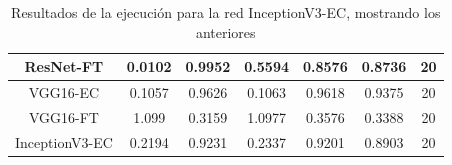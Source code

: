 \documentclass[11pt,a4paper]{article}
\theoremstyle{definition}
\begin{document}
\begin{table}[H]
\begin{tabular}{|c|c|c|c|c|c|c|}
\hline
ResNet-FT                                           & \textcolor[rgb]{0.129,0.129,0.129}{0.0102 } & \textcolor[rgb]{0.129,0.129,0.129}{0.9952 } & \textcolor[rgb]{0.129,0.129,0.129}{0.5594 }                                                                       & \textcolor[rgb]{0.129,0.129,0.129}{0.8576}                                                                             & \textcolor[rgb]{0.129,0.129,0.129}{0.8736}                                                                       & 20                                                                                                              \\
\hline
VGG16-EC                                               & \textcolor[rgb]{0.129,0.129,0.129}{0.1057 } & \textcolor[rgb]{0.129,0.129,0.129}{0.9626 } & \textcolor[rgb]{0.129,0.129,0.129}{0.1063 }                                                                       & \textcolor[rgb]{0.129,0.129,0.129}{0.9618}                                                                             & \textcolor[rgb]{0.129,0.129,0.129}{0.9375}                                                                       & 20                                                                                                              \\
\hline
VGG16-FT                                            & \textcolor[rgb]{0.129,0.129,0.129}{1.099}   & \textcolor[rgb]{0.129,0.129,0.129}{0.3159 } & \textcolor[rgb]{0.129,0.129,0.129}{1.0977 }                                                                       & \textcolor[rgb]{0.129,0.129,0.129}{0.3576}                                                                             & \textcolor[rgb]{0.129,0.129,0.129}{0.3388}                                                                       & 20                                                                                                              \\
\hline
\rowcolor{green} InceptionV3-EC                        & \textcolor[rgb]{0.129,0.129,0.129}{0.2194 } & \textcolor[rgb]{0.129,0.129,0.129}{0.9231 } & \textcolor[rgb]{0.129,0.129,0.129}{0.2337 }                                                                       & \textcolor[rgb]{0.129,0.129,0.129}{0.9201}                                                                             & \textcolor[rgb]{0.129,0.129,0.129}{0.8903}                                                                       & 20                                                                                                              \\
\hline
\end{tabular}

\caption{Resultados de la ejecución para la red InceptionV3-EC, mostrando los anteriores}
\end{table}
\end{document}
